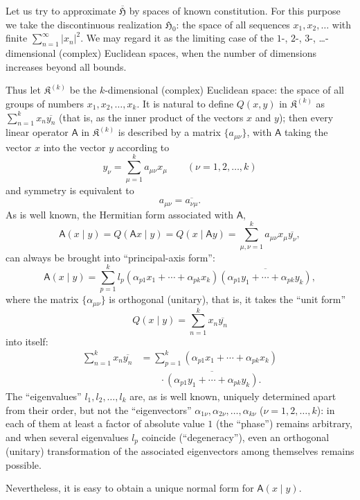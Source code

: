 \documentclass[fontsize=13pt,paper=b5,twoside,bookmarkpackage=false]{scrartcl}
\begin{document}
Let us try to approximate $\overline{\mathfrak{H}}$ by spaces of known constitution. For this purpose we take the discontinuous realization $\mathfrak{H}_0$: the space of all sequences $x_1,x_2,\ldots$ with finite $\sum_{n=1}^{\infty}|x_n|^2$. We may regard it as the limiting case of the $1$-, $2$-, $3$-, \ldots-dimensional (complex) Euclidean spaces, when the number of dimensions increases beyond all bounds.

Thus let $\mathfrak{K}^{(k)}$ be the $k$-dimensional (complex) Euclidean space: the space of all groups of numbers $x_1,x_2,\ldots,x_k$. It is natural to define $Q(x,y)$ in $\mathfrak{K}^{(k)}$ as $\sum_{n=1}^{k}x_n\overline{y_n}$ (that is, as the inner product of the vectors $x$ and $y$); then every linear operator $\mathsf{A}$ in $\mathfrak{K}^{(k)}$ is described by a matrix $\{a_{\mu\nu}\}$, with $\mathsf{A}$ taking the vector $x$ into the vector $y$ according to
\[
 y_\nu=\sum_{\mu=1}^{k}a_{\mu\nu}x_\mu
 \qquad(\nu=1,2,\ldots,k)
\]
and symmetry is equivalent to
\[
 a_{\mu\nu}=\overline{a_{\nu\mu}}.
\]
As is well known, the Hermitian form associated with $\mathsf{A}$,
\[
 \mathsf{A}(x\mid y)=Q(\mathsf{A}x\mid y)=Q(x\mid\mathsf{A}y)
 =\sum_{\mu,\nu=1}^{k}a_{\mu\nu}x_\mu\overline{y_\nu},
\]
can always be brought into ``principal-axis form'':
\[
 \mathsf{A}(x\mid y)=\sum_{p=1}^{k}l_p
 (\alpha_{p1}x_1+\cdots+\alpha_{pk}x_k)
 \overline{(\alpha_{p1}y_1+\cdots+\alpha_{pk}y_k)},
\]
where the matrix $\{\alpha_{\mu\nu}\}$ is orthogonal (unitary), that is, it takes the ``unit form''
\[
 Q(x\mid y)=\sum_{n=1}^{k}x_n\overline{y_n}
\]
into itself:
\begin{align*}
 \sum_{n=1}^{k}x_n\overline{y_n}
 &=\sum_{p=1}^{k}(\alpha_{p1}x_1+\cdots+\alpha_{pk}x_k)\\
 &\qquad\cdot\overline{(\alpha_{p1}y_1+\cdots+\alpha_{pk}y_k)}.
\end{align*}
The ``eigenvalues'' $l_1,l_2,\ldots,l_k$ are, as is well known, uniquely determined apart from their order, but not the ``eigenvectors'' $\alpha_{1\nu},\alpha_{2\nu},\ldots,\alpha_{k\nu}$ ($\nu=1,2,\ldots,k$): in each of them at least a factor of absolute value $1$ (the ``phase'') remains arbitrary, and when several eigenvalues $l_p$ coincide (``degeneracy''), even an orthogonal (unitary) transformation of the associated eigenvectors among themselves remains possible.

Nevertheless, it is easy to obtain a unique normal form for $\mathsf{A}(x\mid y)$.
\end{document}
